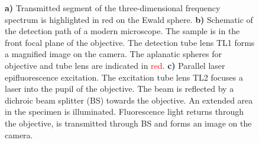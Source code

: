 \begin{figure}[!hbt]
  \centering
  \caption{{\bf a)} Transmitted segment of the three-dimensional
    frequency spectrum is highlighted in red on the Ewald sphere. {\bf
      b)} Schematic of the detection path of a modern microscope. The
    sample is in the front focal plane of the objective. The detection
    tube lens TL1 forms a magnified image on the camera. The aplanatic
    spheres for objective and tube lens are indicated in
    \textcolor{red}{red}. {\bf c)} Parallel laser epifluorescence
    excitation. The excitation tube lens TL2 focuses a laser into the
    pupil of the objective. The beam is reflected by a dichroic beam
    splitter (BS) towards the objective. An extended area in the
    specimen is illuminated. Fluorescence light returns through the
    objective, is transmitted through BS and forms an image on the
    camera. }
  \label{fig:widefield-microscope}
\end{figure}







